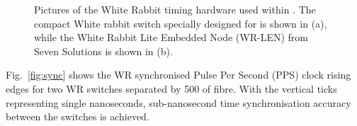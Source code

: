 \begin{figure} %
    \centering
    \quad
    \caption[Pictures of the White Rabbit timing hardware used within \chipsfive.]
    {Pictures of the White Rabbit timing hardware used within \chipsfive. The compact White rabbit
        switch  specially designed for \chips is shown in (a), while the White Rabbit Lite
        Embedded Node (WR-LEN) from Seven Solutions is shown in (b).}
    \label{fig:wr_electronics}
\end{figure}

Fig.~\ref{fig:sync} shows the WR synchronised Pulse Per Second (PPS) clock rising edges for two
\chipsfive WR switches separated by \unit{500}{} of fibre. With the vertical ticks
representing single nanoseconds, sub-nanosecond time synchronisation accuracy between the switches
is achieved.


